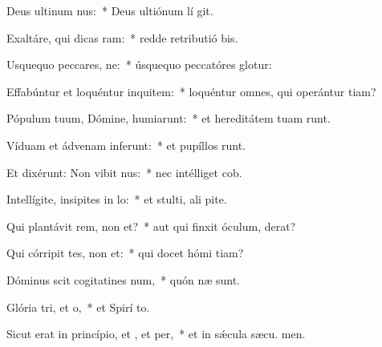 \item Deus ultinum nus:~* Deus ultiónum lí git.
\item Exaltáre, qui dicas ram:~* redde retributió bis.
\item Usquequo peccares, ne:~* úsquequo peccatóres glotur:
\item Effabúntur et loquéntur inquitem:~* loquéntur omnes, qui operántur tiam?
\item Pópulum tuum, Dómine, humiarunt:~* et hereditátem tuam runt.
\item Víduam et ádvenam inferunt:~* et pupíllos runt.
\item Et dixérunt: Non vibit nus:~* nec intélliget  cob.
\item Intellígite, insipites in lo:~* et stulti, ali pite.
\item Qui plantávit rem, non et?~* aut qui finxit óculum,  derat?
\item Qui córripit tes, non et:~* qui docet hómi tiam?
\item Dóminus scit cogitatines num,~* quón næ sunt.
\item Glória tri, et o,~* et Spirí to.
\item Sicut erat in princípio, et , et per,~* et in sǽcula sæcu. men.
